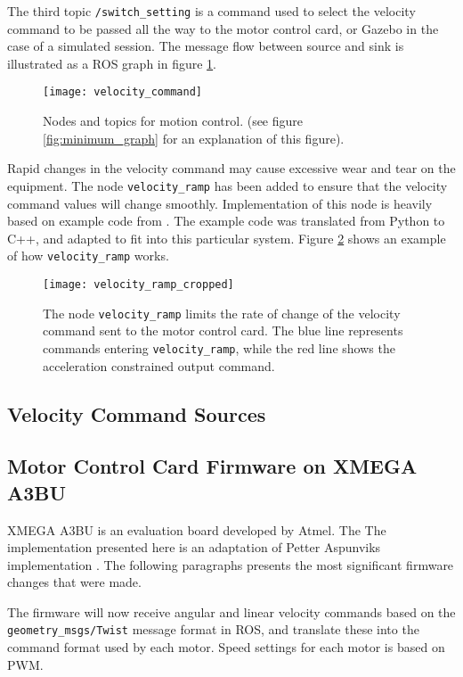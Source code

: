 The third topic \texttt{/switch\_setting} is a command used to select the velocity command to be passed all the way to the motor control card, or Gazebo in the case of a simulated session. The message flow between source and sink is illustrated as a \ac{ROS} graph in figure \ref{fig:move_base_nodes}.

\begin{figure}[h]
	\centering
	\texttt{[image: velocity\_command]}
	\caption{Nodes and topics for motion control. (see figure \ref{fig:minimum_graph} for an explanation of this figure).}
	\label{fig:move_base_nodes}
\end{figure}

Rapid changes in the velocity command may cause excessive wear and tear on the equipment. The node \texttt{velocity\_ramp} has been added to ensure that the velocity command values will change smoothly. Implementation of this node is heavily based on example code from \cite{rosbook15}. The example code was translated from Python to C++, and adapted to fit into this particular system. Figure \ref{fig:velocity_ramp} shows an example of how \texttt{velocity\_ramp} works.

\begin{figure}[h]
	\centering
	\texttt{[image: velocity\_ramp\_cropped]}
	\caption{The node \texttt{velocity\_ramp} limits the rate of change of the velocity command sent to the motor control card. The blue line represents commands entering \texttt{velocity\_ramp}, while the red line shows the acceleration constrained output command.}
	\label{fig:velocity_ramp}
\end{figure}

\subsection{Velocity Command Sources}



\subsection{Motor Control Card Firmware on XMEGA A3BU}

XMEGA A3BU is an evaluation board developed by Atmel. The The implementation presented here is an adaptation of Petter Aspunviks implementation \cite{aspunvik}. The following paragraphs presents the most significant firmware changes that were made.

The firmware will now receive angular and linear velocity commands based on the \texttt{geometry\_msgs/Twist} message format in \ac{ROS}, and translate these into the command format used by each motor. Speed settings for each motor is based on \ac{PWM}. 

